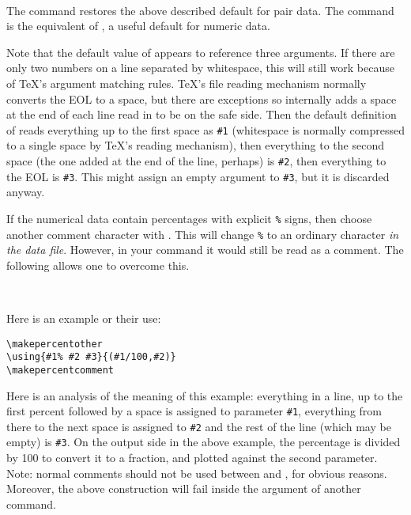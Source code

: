 \documentclass[letterpaper]{article}
\begin{document}
\begin{cd}
\\
%
%
\end{cd}

The command  restores the above described default
for pair data. The command  is the equivalent of
, a useful default for numeric data.

Note that the default value of  appears to reference three
arguments. If there are only two numbers on a line separated by
whitespace, this will still work because of \TeX{}'s argument matching
rules. \TeX{}'s file reading mechanism normally converts the EOL to a
space, but there are exceptions so \mfp{} internally adds a space at
the end of each line read in to be on the safe side. Then the default
definition of  reads everything up to the first space as
\texttt{\#1} (whitespace is normally compressed to a single space by
\TeX{}'s reading mechanism), then everything to the second space (the one
added at the end of the line, perhaps) is \texttt{\#2}, then everything
to the EOL is \texttt{\#3}. This might assign an empty argument to
\texttt{\#3}, but it is discarded anyway.

If the numerical data contain percentages with explicit \texttt{\%} signs,
then choose another comment character with . This
will change \texttt{\%} to an ordinary character \emph{in the data file}.
However, in your  command it would still be read as a comment.
The following allows one to overcome this.

\begin{cd}
\\
%
%
\end{cd}

Here is an example or their use:
\begin{verbatim}
\makepercentother
\using{#1% #2 #3}{(#1/100,#2)}
\makepercentcomment
\end{verbatim}

Here is an analysis of the meaning of this example: everything in a
line, up to the first percent followed by a space is assigned to
parameter \texttt{\#1}, everything from there to the next space is
assigned to \texttt{\#2} and the rest of the line (which may be empty)
is \texttt{\#3}. On the output side in the above example, the percentage
is divided by 100 to convert it to a fraction, and plotted against the
second parameter. Note: normal comments should not be used between
 and , for obvious reasons.
Moreover, the above construction will fail inside the argument of
another command.
\end{document}
